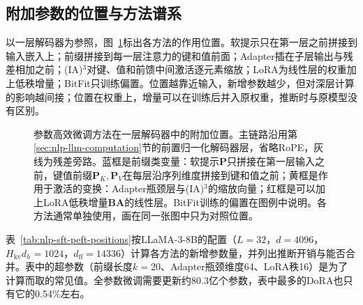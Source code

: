 \subsection{附加参数的位置与方法谱系}
\label{sec:nlp-sft-peft-positions}

以一层解码器为参照，图~\ref{fig:nlp-sft-peft-positions}标出各方法的作用位置。软提示只在第一层之前拼接到输入嵌入上；前缀拼接到每一层注意力的键和值前面；Adapter插在子层输出与残差相加之前；(IA)$^3$对键、值和前馈中间激活逐元素缩放；LoRA为线性层的权重加上低秩增量；BitFit只训练偏置。位置越靠近输入，新增参数越少，但对深层计算的影响越间接；位置在权重上，增量可以在训练后并入原权重，推断时与原模型没有区别。

\begin{figure}[htbp]
  \centering
  
  \caption{参数高效微调方法在一层解码器中的附加位置。主链路沿用第\ref{sec:nlp-llm-computation}节的前置归一化解码器层，省略RoPE，灰线为残差旁路。蓝框是前缀类变量：软提示$\bm P$只拼接在第一层输入之前，键值前缀$\bm P_K,\bm P_V$在每层沿序列维度拼接到键和值之前；黄框是作用于激活的变换：Adapter瓶颈层与(IA)$^3$的缩放向量；红框是可以加上LoRA低秩增量$\bm B\bm A$的线性层。BitFit训练的偏置在图例中说明。各方法通常单独使用，画在同一张图中只为对照位置。}
  \label{fig:nlp-sft-peft-positions}
\end{figure}

表~\ref{tab:nlp-sft-peft-positions}按LLaMA-3-8B的配置（$L=32$，$d=4096$，$H_{\mathrm{kv}}d_h=1024$，$d_{\mathrm{ff}}=14336$）计算各方法的新增参数量，并列出推断开销与能否合并。表中的超参数（前缀长度$k=20$、Adapter瓶颈维度64、LoRA秩16）是为了计算而取的常见值。全参数微调需要更新约80.3亿个参数，表中最多的DoRA也只有它的0.54\%左右。

